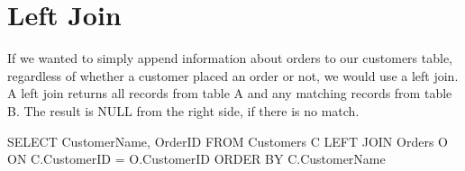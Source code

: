 \documentclass[
]{book}
\newenvironment{Shaded}{\begin{snugshade}}{\end{snugshade}}
\newcommand{\AttributeTok}[1]{\textcolor[rgb]{0.13,0.29,0.53}{#1}}
\newcommand{\ConstantTok}[1]{\textcolor[rgb]{0.56,0.35,0.01}{#1}}
\newcommand{\FunctionTok}[1]{\textcolor[rgb]{0.13,0.29,0.53}{\textbf{#1}}}
\newcommand{\NormalTok}[1]{#1}
\newcommand{\OtherTok}[1]{\textcolor[rgb]{0.56,0.35,0.01}{#1}}
\newcommand{\SpecialCharTok}[1]{\textcolor[rgb]{0.81,0.36,0.00}{\textbf{#1}}}
\newcommand{\StringTok}[1]{\textcolor[rgb]{0.31,0.60,0.02}{#1}}
\begin{document}
\begin{Shaded}
\end{Shaded}

\hypertarget{left-join}{%
\section{Left Join}\label{left-join}}

If we wanted to simply append information about orders to our customers table, regardless of whether a customer placed an order or not, we would use a left join. A left join returns all records from table A and any matching records from table B. The result is NULL from the right side, if there is no match.

\begin{Shaded}
\begin{Highlighting}[]
\NormalTok{SELECT CustomerName, OrderID}
\NormalTok{  FROM Customers C}
\NormalTok{    LEFT JOIN Orders O}
\NormalTok{      ON C.CustomerID }\OtherTok{=}\NormalTok{ O.CustomerID}
\NormalTok{        ORDER BY C.CustomerName}
\end{Highlighting}
\end{Shaded}

\begin{Shaded}
\end{Shaded}
\end{document}

